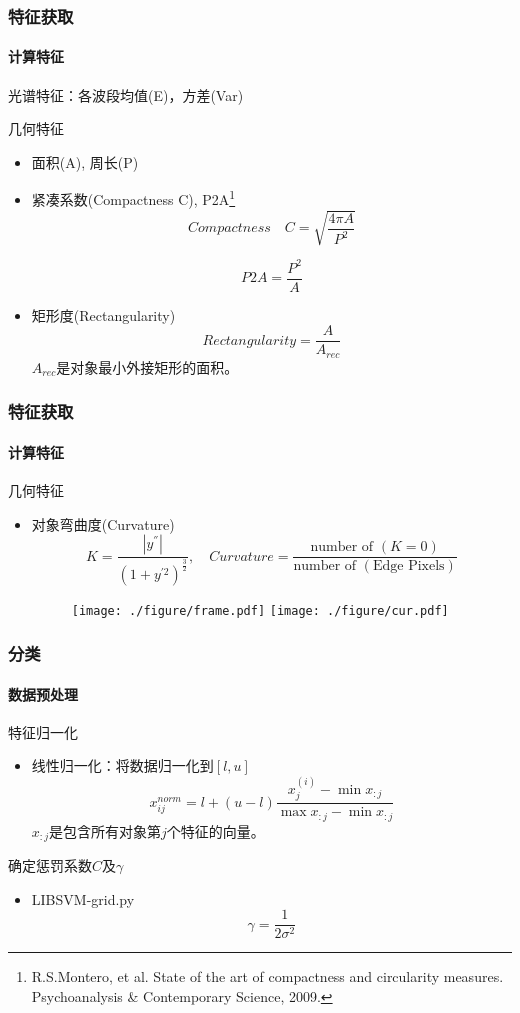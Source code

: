 \documentclass[10pt]{beamer}
\begin{document}
\begin{frame}
\frametitle{特征获取}
\framesubtitle{计算特征}
\small
光谱特征：各波段均值(E)，方差(Var)
\begin{block}{几何特征}
	\footnotesize
	\begin{itemize}
		\item 面积(A), 周长(P)
		\item 紧凑系数(Compactness C), P2A\footnote{R.S.Montero, et al. State of the art of compactness and circularity measures. Psychoanalysis \& Contemporary Science, 2009.}
		\[Compactness \quad C =\sqrt{\frac{4\pi A}{P^2}}\]
		
		 \[P2A=\frac{P^2}{A}\]
		\item 矩形度(Rectangularity)
		\[Rectangularity=\frac{A}{A_{rec}}\]
		$A_{rec}$是对象\alert{最小外接矩形}的面积。
	\end{itemize}
\end{block}
\end{frame}

\begin{frame}
\frametitle{特征获取}
\framesubtitle{计算特征}
\begin{block}{几何特征}
	\begin{itemize}
		\item 对象弯曲度(Curvature)
		\[K=\frac{|y^{''}|}{(1+y^{'2})^{\frac{3}{2}}},\quad Curvature=\frac{\text{number of }(K=0)}{\text{number of }(\text{Edge Pixels})}\]
				\begin{figure}
			\centering
			\texttt{[image: ./figure/frame.pdf]}
			\texttt{[image: ./figure/cur.pdf]}
		\end{figure}
	\end{itemize}
\end{block}
\end{frame}

\begin{frame}
\frametitle{分类}
\framesubtitle{数据预处理}
\begin{block}{特征归一化}
	\begin{itemize}
	\item 线性归一化：将数据归一化到$[l,u]$
	\[x_{ij}^{norm}=l+(u-l)\frac{x_j^{(i)}-\min x_{:j}}{\max x_{:j}-\min x_{:j}}\]
	$x_{:j}$是包含所有对象第$j$个特征的向量。
	\end{itemize}
\end{block}
\begin{block}{确定惩罚系数$C$及$\gamma$}
	\begin{itemize}
		\item LIBSVM-grid.py
			\[\gamma=\frac{1}{2\sigma^2}\]
	\end{itemize}
\end{block}
\end{frame}
\end{document}
